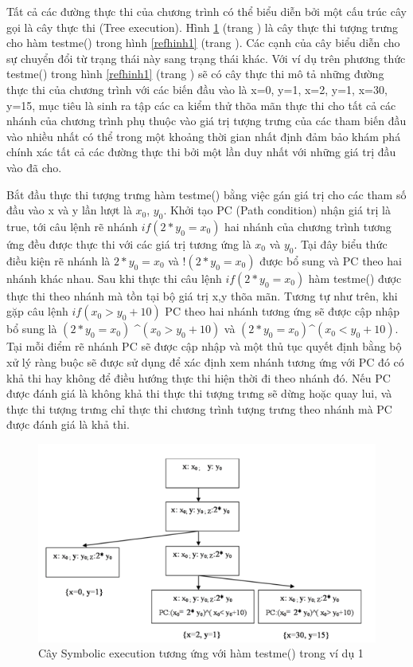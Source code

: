 \documentclass[12pt,a4paper]{report}
\begin{document}
\indent Tất cả các đường thực thi của chương trình có thể biểu diễn bởi một cấu trúc cây gọi là cây thực thi (Tree execution). Hình \ref{refhinh2} (trang \pageref{refhinh2}) là cây thực thi tượng trưng cho hàm testme() trong hình \ref{refhinh1} (trang \pageref{refhinh1}). Các cạnh của cây biểu diễn cho sự chuyển đổi từ trạng thái này sang trạng thái khác. Với ví dụ trên phương thức testme() trong hình \ref{refhinh1} (trang \pageref{refhinh1}) sẽ có cây thực thi mô tả những đường thực thi của chương trình với các biến đầu vào là {x=0, y=1}, {x=2, y=1}, {x=30, y=15}, mục tiêu là sinh ra tập các ca kiểm thử thõa mãn thực thi cho tất cả các nhánh của chương trình phụ thuộc vào giá trị tượng trưng của các tham biến đầu vào nhiều nhất có thể trong một khoảng thời gian nhất định đảm bảo khám phá chính xác tất cả các đường thực thi bởi một lần duy nhất với những giá trị đầu vào đã cho.

\indent Bắt đầu thực thi tượng trưng hàm testme() bằng việc gán giá trị cho các tham số đầu vào x và y lần lượt là \textit{$x_0$}, \textit{$y_0$}. Khởi tạo PC (Path condition) nhận giá trị là true, tới câu lệnh rẽ nhánh \textit{$if(2*y_0=x_0)$} hai nhánh của chương trình tương ứng đều được thực thi với các giá trị tương ứng là \textit{$x_0$} và \textit{$y_0$}. Tại đây biểu thức điều kiện rẽ nhánh là \textit{$2*y_0=x_0$} và \textit{$!(2*y_0=x_0)$} được bổ sung và PC theo hai nhánh khác nhau. Sau khi thực thi câu lệnh \textit{$if(2*y_0=x_0)$} hàm testme() được thực thi theo nhánh mà tồn tại bộ giá trị x,y thõa mãn. Tương tự như trên, khi gặp câu lệnh \textit{$if(x_0>y_0+10)$} PC theo hai nhánh tương ứng sẽ được cập nhập bổ sung là \textit{$(2*y_0=x_0)$} \^ {}\textit{$(x_0>y_0+10)$} và \textit{$(2*y_0=x_0)$}\^{}\textit{$(x_0<y_0+10)$}. Tại mỗi điểm rẽ nhánh PC sẽ được cập nhập và một thủ tục quyết định bằng bộ xử lý ràng buộc sẽ được sử dụng để xác định xem nhánh tương ứng với PC đó có khả thi hay không để điều hướng thực thi hiện thời đi theo nhánh đó. Nếu PC được đánh giá là không khả thi thực thi tượng trưng sẽ dừng hoặc quay lui, và thực thi tượng trưng chỉ thực thi chương trình tượng trưng theo nhánh mà PC được đánh giá là khả thi.

\begin{figure}[ht]
\begin{center}
\includegraphics[scale=0.9]{hinhanh/hinh2}
\end{center}
\caption{Cây Symbolic execution tương ứng với hàm testme() trong ví dụ 1}
\label{refhinh2}
\end{figure}
\end{document}
